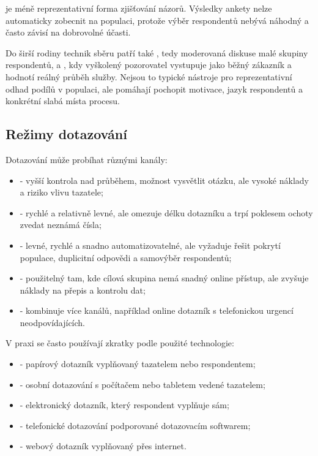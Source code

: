  je méně reprezentativní forma zjišťování názorů. Výsledky ankety nelze automaticky
zobecnit na populaci, protože výběr respondentů nebývá náhodný a často závisí na dobrovolné účasti.

Do širší rodiny technik sběru patří také , tedy moderovaná diskuse malé skupiny
respondentů, a , kdy vyškolený pozorovatel vystupuje jako běžný zákazník a
hodnotí reálný průběh služby. Nejsou to typické nástroje pro reprezentativní odhad podílů v populaci,
ale pomáhají pochopit motivace, jazyk respondentů a konkrétní slabá místa procesu.

\subsection{Režimy dotazování}
Dotazování může probíhat různými kanály:
\begin{itemize}
  \item {} - vyšší kontrola nad průběhem, možnost vysvětlit otázku, ale vysoké
  náklady a riziko vlivu tazatele;
  \item {} - rychlé a relativně levné, ale omezuje délku dotazníku a trpí
  poklesem ochoty zvedat neznámá čísla;
  \item {} - levné, rychlé a snadno automatizovatelné, ale vyžaduje řešit
  pokrytí populace, duplicitní odpovědi a samovýběr respondentů;
  \item {} - použitelný tam, kde cílová skupina nemá snadný online přístup,
  ale zvyšuje náklady na přepis a kontrolu dat;
  \item {} - kombinuje více kanálů, například online dotazník s telefonickou
  urgencí neodpovídajících.
\end{itemize}

V praxi se často používají zkratky podle použité technologie:
\begin{itemize}
  \item {} - papírový dotazník vyplňovaný tazatelem nebo respondentem;
  \item {} - osobní dotazování s počítačem nebo tabletem vedené tazatelem;
  \item {} - elektronický dotazník, který respondent vyplňuje sám;
  \item {} - telefonické dotazování podporované dotazovacím softwarem;
  \item {} - webový dotazník vyplňovaný přes internet.
\end{itemize}

